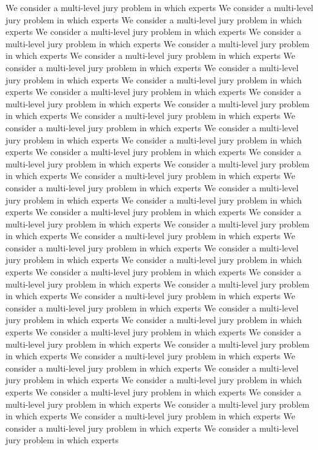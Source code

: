\documentclass[letterpaper]{article} %
\begin{document}
%
%
%
%
We consider a multi-level jury problem in which experts
We consider a multi-level jury problem in which experts
We consider a multi-level jury problem in which experts
We consider a multi-level jury problem in which experts
We consider a multi-level jury problem in which experts
We consider a multi-level jury problem in which experts
We consider a multi-level jury problem in which experts
We consider a multi-level jury problem in which experts
We consider a multi-level jury problem in which experts
We consider a multi-level jury problem in which experts
We consider a multi-level jury problem in which experts
We consider a multi-level jury problem in which experts
We consider a multi-level jury problem in which experts
We consider a multi-level jury problem in which experts
We consider a multi-level jury problem in which experts
We consider a multi-level jury problem in which experts
We consider a multi-level jury problem in which experts
We consider a multi-level jury problem in which experts
We consider a multi-level jury problem in which experts
We consider a multi-level jury problem in which experts
We consider a multi-level jury problem in which experts
We consider a multi-level jury problem in which experts
We consider a multi-level jury problem in which experts
We consider a multi-level jury problem in which experts
We consider a multi-level jury problem in which experts
We consider a multi-level jury problem in which experts
We consider a multi-level jury problem in which experts
We consider a multi-level jury problem in which experts
We consider a multi-level jury problem in which experts
We consider a multi-level jury problem in which experts
We consider a multi-level jury problem in which experts
We consider a multi-level jury problem in which experts
We consider a multi-level jury problem in which experts
We consider a multi-level jury problem in which experts
We consider a multi-level jury problem in which experts
We consider a multi-level jury problem in which experts
We consider a multi-level jury problem in which experts
We consider a multi-level jury problem in which experts
We consider a multi-level jury problem in which experts
We consider a multi-level jury problem in which experts
We consider a multi-level jury problem in which experts
We consider a multi-level jury problem in which experts
We consider a multi-level jury problem in which experts
We consider a multi-level jury problem in which experts
We consider a multi-level jury problem in which experts
We consider a multi-level jury problem in which experts
We consider a multi-level jury problem in which experts
We consider a multi-level jury problem in which experts
We consider a multi-level jury problem in which experts
We consider a multi-level jury problem in which experts
We consider a multi-level jury problem in which experts
\clearpage

\end{document}
